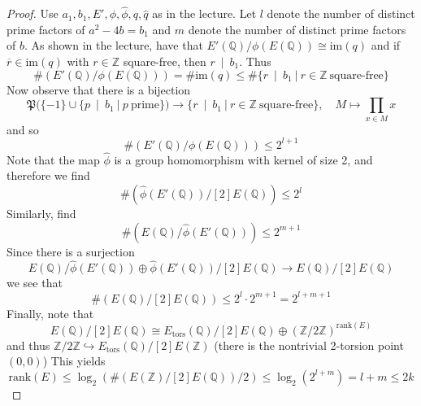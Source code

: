 \documentclass{scrartcl}
\newcommand{\Z}{\mathbb{Z}}
\newcommand{\Q}{\mathbb{Q}}
\newcommand{\im}{\mathrm{im}}
\newcommand{\divides}{\ \mid \ }
\theoremstyle{definition}
\begin{document}
\begin{proof}
    Use $a_1, b_1, E', \phi, \hat{\phi}, q, \hat{q}$ as in the lecture.
    Let $l$ denote the number of distinct prime factors of $a^2 - 4b = b_1$ and $m$ denote the number of distinct prime factors of $b$.
    As shown in the lecture, have that $E'(\Q)/\phi(E(\Q)) \cong \im(q)$ and if $\overline{r} \in \im(q)$ with $r \in \Z$ square-free, then $r \divides b_1$.
    Thus
    \begin{equation*}
        \#(E'(\Q)/\phi(E(\Q))) = \#\im(q) \leq \#\{ r \divides b_1 \ | \ r \in \Z \ \text{square-free}\}
    \end{equation*}
    Now observe that there is a bijection
    \begin{equation*}
        \mathfrak{P}(\{ -1 \} \cup \{ p \divides b_1 \ | \ p \ \text{prime}\}) \to \{ r \divides b_1 \ | \ r \in \Z \ \text{square-free} \}, \quad M \mapsto \prod_{x \in M} x
    \end{equation*}
    and so
    \begin{equation*}
        \#(E'(\Q)/\phi(E(\Q))) \leq 2^{l + 1}
    \end{equation*}
    Note that the map $\hat{\phi}$ is a group homomorphism with kernel of size 2, and therefore we find
    \begin{equation*}
        \#(\hat{\phi}(E'(\Q))/[2]E(\Q)) \leq 2^l
    \end{equation*}
    Similarly, find
    \begin{equation*}
        \#(E(\Q)/\hat{\phi}(E'(\Q))) \leq 2^{m + 1}
    \end{equation*}
    Since there is a surjection
    \begin{equation*}
        E(\Q)/\hat{\phi}(E'(\Q)) \oplus \hat{\phi}(E'(\Q))/[2]E(\Q) \to E(\Q)/[2]E(\Q)
    \end{equation*}
    we see that
    \begin{equation}
        \#(E(\Q)/[2]E(\Q)) \leq 2^l \cdot 2^{m + 1} = 2^{l + m + 1} \label{eq:general_bound}
    \end{equation}
    Finally, note that
    \begin{equation*}
        E(\Q)/[2]E(\Q) \cong E_{\mathrm{tors}}(\Q)/[2]E(\Q) \oplus (\Z/2\Z)^{\mathrm{rank}(E)}
    \end{equation*}
    and thus $\Z/2\Z \hookrightarrow E_{\mathrm{tors}}(\Q)/[2]E(\Z)$ (there is the nontrivial 2-torsion point $(0, 0)$)
    This yields
    \begin{equation*}
        \mathrm{rank}(E) \leq \log_2(\#(E(\Z)/[2]E(\Q)) / 2) \leq \log_2(2^{l + m}) = l + m \leq 2k
    \end{equation*}


\end{proof}
\end{document}
